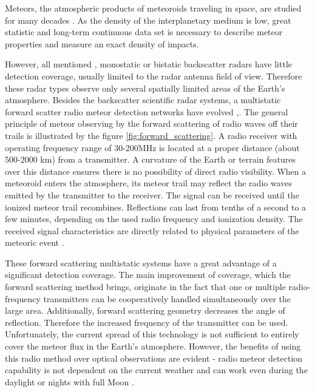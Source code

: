 \documentclass[twoside]{ctuthesis}
\theoremstyle{plain}
\theoremstyle{definition}
\theoremstyle{note}
\begin{document}
Meteors, the atmospheric products of meteoroids traveling in space, are studied for many decades \cite{interplanetary_medium}. As the density of the interplanetary medium is low, great statistic and long-term continuous data set is necessary to describe meteor properties and measure an exact density of impacts.

However, all mentioned  \cite{skiymet},\cite{CMOR_radar}  monostatic or bistatic backscatter radars have little detection coverage, usually limited to the radar antenna field of view. Therefore these radar types observe only several spatially limited areas of the Earth's atmosphere.
Besides the backscatter scientific radar systems, a multistatic forward scatter radio meteor detection networks have evolved \cite{BRAMS},\cite{RETRAM}.
The general principle of meteor observing by the forward scattering of radio waves off their trails is illustrated by the figure \ref{fig:forward_scattering}. A radio receiver with operating frequency range of 30-200MHz is located at a proper distance (about 500-2000 km) from a transmitter. A curvature of the Earth or terrain features over this distance ensures there is no possibility of direct radio visibility. When a meteoroid enters the atmosphere, its meteor trail may reflect the radio waves emitted by the transmitter to the receiver. The signal can be received until the ionized meteor trail recombines. Reflections can last from tenths of a second to a few minutes, depending on the used radio frequency and ionization density. The received signal characteristics are directly related to physical parameters of the meteoric event \cite{forward_scatter}.

These forward scattering multistatic systems have a great advantage of a significant detection coverage. 
The main improvement of coverage, which the forward scattering method brings, originate in the fact that one or multiple radio-frequency transmitters can be cooperatively handled simultaneously over the large area. Additionally, forward scattering geometry decreases the angle of reflection. Therefore the increased frequency of the transmitter can be used. Unfortunately, the current spread of this technology is not sufficient to entirely cover the meteor flux in the Earth's atmosphere.
However, the benefits of using this radio method over optical observations are evident - radio meteor detection capability is not dependent on the current weather and can work even during the daylight or nights with full Moon \cite{daylight_shover}.
\end{document}
